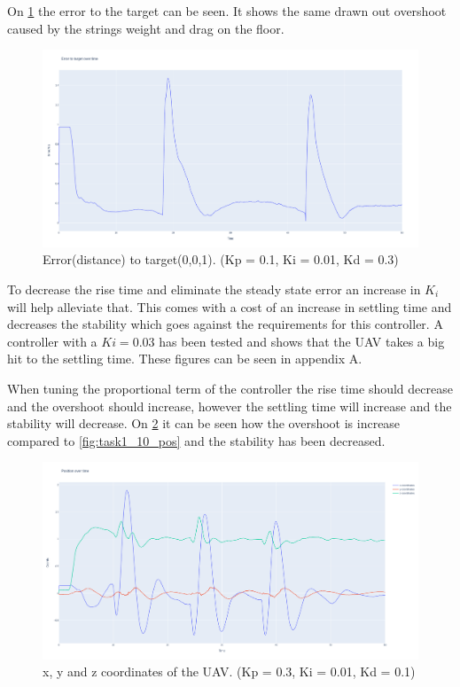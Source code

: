 \documentclass[conference]{IEEEtran}
\begin{document}
On \cref{fig:task1_11_err} the error to the target can be seen. It shows the same drawn out overshoot caused by the strings weight and drag on the floor.

\begin{figure}[hbtp]
	\centering
	\includegraphics[width=1.0\linewidth]{images/task1_11_err.png}
	\caption{Error(distance) to target(0,0,1). (Kp = 0.1, Ki = 0.01, Kd = 0.3)}
	\label{fig:task1_11_err}
\end{figure}

To decrease the rise time and eliminate the steady state error an increase in $K_i$ will help alleviate that. This comes with a cost of an increase in settling time and decreases the stability which goes against the requirements for this controller. A controller with a $Ki=0.03$ has been tested and shows that the UAV takes a big hit to the settling time. These figures can be seen in appendix A.

When tuning the proportional term of the controller the rise time should decrease and the overshoot should increase, however the settling time will increase and the stability will decrease. On \cref{fig:task1_4_pos} it can be seen how the overshoot is increase compared to \cref{fig:task1_10_pos} and the stability has been decreased. 

\begin{figure}[hbtp]
	\centering
	\includegraphics[width=1.0\linewidth]{images/task1_4_pos.png}
	\caption{x, y and z coordinates of the UAV. (Kp = 0.3, Ki = 0.01, Kd = 0.1)}
	\label{fig:task1_4_pos}
\end{figure}
\end{document}
